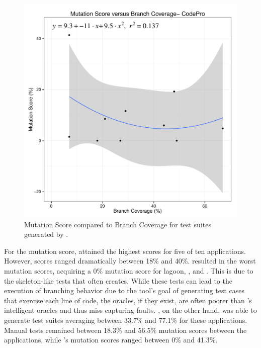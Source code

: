 \begin{figure}[!t]
\centering
  \includegraphics[width=\linewidth]{RGraphs/CodePro_BranchCov_versus_Mutation_poly.pdf}
    \caption{Mutation Score compared to Branch Coverage for test suites generated by \codepro.}
  \label{fig:CP_branch_mutation}
\end{figure}
For the mutation score, \evo attained the highest scores for five of ten applications. However, \diebierse scores ranged dramatically between 18\% and 40\%.  \codepro resulted in the worst mutation scores, acquiring a  0\% mutation score for lagoon, \saxpath, and \xisemele. This is due to the skeleton-like tests that \codepro often creates.  While these tests can lead to the execution of branching behavior due to the tool's goal of generating test cases that exercise each line of code, the oracles, if they exist, are often poorer than \evo's intelligent oracles and thus miss capturing faults. \evo, on the other hand, was able to generate test suites averaging between 33.7\% and 77.1\% for these applications. Manual tests remained between 18.3\% and 56.5\%  mutation scores between the applications, while \codepro's mutation scores ranged between 0\% and 41.3\%. 


